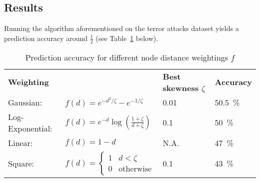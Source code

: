 \subsection{Results}
\label{subsec:Results}

Running the algorithm aforementioned on the terror attacks dataset yields a prediction accuracy around $\frac{1}{2}$ (see Table~\ref{tab:Prediction accuracy for different node distance weightings} below).

\begin{table}[H]
\caption{Prediction accuracy for different node distance weightings $f$}
\begin{center}
\begin{tabular}{l l l l}
\multicolumn{2}{l}{
\textbf{Weighting}}														& \textbf{Best skewness $\zeta$}		& \textbf{Accuracy}\\

Gaussian:			& $f(d)=e^{-d^2/\zeta}-e^{-1/\zeta}$							& \SI{0.01}{}						&\SI{50.5}{\percent} \\

Log-Exponential:	& $f(d)=e^{-d} \log\left( \frac{1+\zeta}{d+\zeta}\right)$				&\SI{0.1}{}							& \SI{50}{\percent} \\ 

Linear:			& $f(d)=1-d$											& N.A. 							&\SI{47}{\percent} \\

Square:			&$f(d)= \begin{cases}
1				&d < \zeta \\
0				& \text{otherwise}
				\end{cases}$											& \SI{0.1}{}						& \SI{43}{\percent}
\end{tabular}
\end{center}
\label{tab:Prediction accuracy for different node distance weightings}
\end{table}
